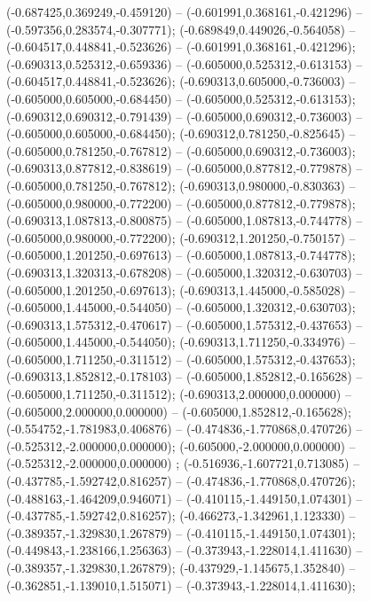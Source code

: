  (-0.687425,0.369249,-0.459120) -- (-0.601991,0.368161,-0.421296) -- (-0.597356,0.283574,-0.307771);
 (-0.689849,0.449026,-0.564058) -- (-0.604517,0.448841,-0.523626) -- (-0.601991,0.368161,-0.421296);
 (-0.690313,0.525312,-0.659336) -- (-0.605000,0.525312,-0.613153) -- (-0.604517,0.448841,-0.523626);
 (-0.690313,0.605000,-0.736003) -- (-0.605000,0.605000,-0.684450) -- (-0.605000,0.525312,-0.613153);
 (-0.690312,0.690312,-0.791439) -- (-0.605000,0.690312,-0.736003) -- (-0.605000,0.605000,-0.684450);
 (-0.690312,0.781250,-0.825645) -- (-0.605000,0.781250,-0.767812) -- (-0.605000,0.690312,-0.736003);
 (-0.690313,0.877812,-0.838619) -- (-0.605000,0.877812,-0.779878) -- (-0.605000,0.781250,-0.767812);
 (-0.690313,0.980000,-0.830363) -- (-0.605000,0.980000,-0.772200) -- (-0.605000,0.877812,-0.779878);
 (-0.690313,1.087813,-0.800875) -- (-0.605000,1.087813,-0.744778) -- (-0.605000,0.980000,-0.772200);
 (-0.690312,1.201250,-0.750157) -- (-0.605000,1.201250,-0.697613) -- (-0.605000,1.087813,-0.744778);
 (-0.690313,1.320313,-0.678208) -- (-0.605000,1.320312,-0.630703) -- (-0.605000,1.201250,-0.697613);
 (-0.690313,1.445000,-0.585028) -- (-0.605000,1.445000,-0.544050) -- (-0.605000,1.320312,-0.630703);
 (-0.690313,1.575312,-0.470617) -- (-0.605000,1.575312,-0.437653) -- (-0.605000,1.445000,-0.544050);
 (-0.690313,1.711250,-0.334976) -- (-0.605000,1.711250,-0.311512) -- (-0.605000,1.575312,-0.437653);
 (-0.690313,1.852812,-0.178103) -- (-0.605000,1.852812,-0.165628) -- (-0.605000,1.711250,-0.311512);
 (-0.690313,2.000000,0.000000) -- (-0.605000,2.000000,0.000000) -- (-0.605000,1.852812,-0.165628);
 (-0.554752,-1.781983,0.406876) -- (-0.474836,-1.770868,0.470726) -- (-0.525312,-2.000000,0.000000);
 (-0.605000,-2.000000,0.000000) -- (-0.525312,-2.000000,0.000000) ;
 (-0.516936,-1.607721,0.713085) -- (-0.437785,-1.592742,0.816257) -- (-0.474836,-1.770868,0.470726);
 (-0.488163,-1.464209,0.946071) -- (-0.410115,-1.449150,1.074301) -- (-0.437785,-1.592742,0.816257);
 (-0.466273,-1.342961,1.123330) -- (-0.389357,-1.329830,1.267879) -- (-0.410115,-1.449150,1.074301);
 (-0.449843,-1.238166,1.256363) -- (-0.373943,-1.228014,1.411630) -- (-0.389357,-1.329830,1.267879);
 (-0.437929,-1.145675,1.352840) -- (-0.362851,-1.139010,1.515071) -- (-0.373943,-1.228014,1.411630);
